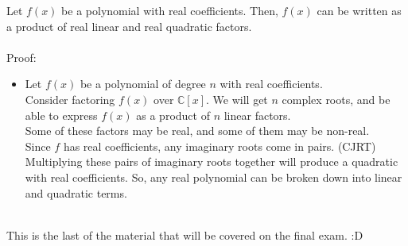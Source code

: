 \documentclass{letter}
\begin{document}
	Let $f(x)$ be a polynomial with real coefficients. Then, $f(x)$ can be written as a product of real linear and real quadratic factors.\\\\
	Proof:\\
	\begin{itemize}
		\item[ ] Let $f(x)$ be a polynomial of degree $n$ with real coefficients.\\
		Consider factoring $f(x)$ over $\mathbb{C}\left[ x \right]$. We will get $n$ complex roots, and be able to express $f(x)$ as a product of $n$ linear factors.\\ 
		Some of these factors may be real, and some of them may be non-real.\\
		Since $f$ has real coefficients, any imaginary roots come in pairs. (CJRT) Multiplying these pairs of imaginary roots together will produce a quadratic with real coefficients. So, any real polynomial can be broken down into linear and quadratic terms.\\\\
	\end{itemize}
		This is the last of the material that will be covered on the final exam. :D
	
	
\end{document}
